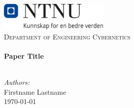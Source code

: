 



\def\TITLE{Paper Title} %


\def\AUTHORS{
    Firstname Lastname \\
} %



\begin{titlepage}

    \vbox{ }

    \vbox{ }

    \begin{center}
        \includegraphics[width=0.40\textwidth]{Images/NTNU_logo.png}\\[1cm]
        \textsc{\LARGE Department of Engineering Cybernetics}\\[1.0cm]



        \vbox{ }
        \HRule \\[0.4cm]
        { \huge \bfseries \TITLE}\\[0.4cm]
        \HRule \\[1.5cm]
        \large


        \emph{Authors:}\\
        \AUTHORS


        \vfill
        {\large \today}
    \end{center}
\end{titlepage}








